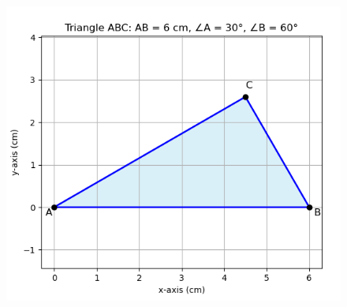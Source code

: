 \documentclass[journal,12pt,onecolumn]{IEEEtran}
\begin{document}
\begin{figure}[H]
\centering
\includegraphics[width=0.7\linewidth]{figs/fig1.png}
\caption{}
\label{fig}
\end{figure}
\end{document}
